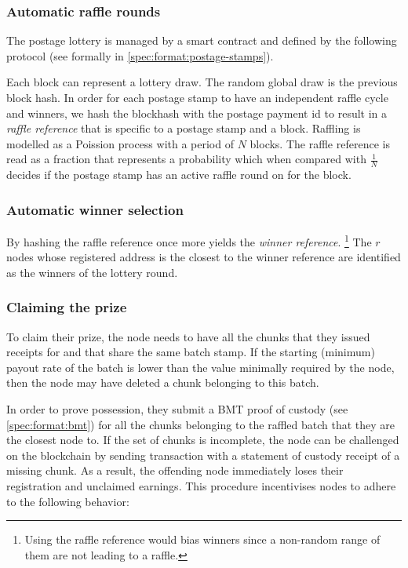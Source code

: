 \subsubsection{Automatic raffle rounds}
The postage lottery is managed by a smart contract and defined by the following protocol (see formally in \ref{spec:format:postage-stamps}).

Each block can represent a lottery draw. The random global draw is the previous block hash. In order for each postage stamp to have an independent raffle cycle and winners, we hash the blockhash with the postage payment id to result in a \emph{raffle reference}  that is specific to a postage stamp and a block. Raffling is modelled as a Poission process with a period of $N$ blocks. The raffle reference is read as a fraction that represents a probability which when  compared with $\frac{1}{N}$ decides if the postage stamp has an active raffle round on for the block. 


\subsubsection{Automatic winner selection}

By hashing the raffle reference once more yields the \emph{winner reference}.%
%
\footnote{Using the raffle reference would bias winners since a non-random range of them are not leading to a raffle.}
The $r$ nodes whose registered address  is the closest to the winner reference are identified as the winners of the lottery round. 

\subsubsection{Claiming the prize}

To claim their prize, the node needs to have all the chunks that they issued receipts for and that share the same batch stamp. If the starting (minimum) payout rate of the batch is lower than the value minimally required by the node, then the node may have deleted a chunk belonging  to this batch.

In order to prove possession, they submit a BMT proof of custody (see \ref{spec:format:bmt}) for all the chunks belonging to the raffled batch that they are the closest node to. If the set of chunks is incomplete, the node can be challenged on the blockchain by sending transaction  with a statement of custody receipt of a missing chunk. As a result, the offending node immediately loses their registration and unclaimed earnings. This procedure incentivises nodes to adhere to the following behavior:

